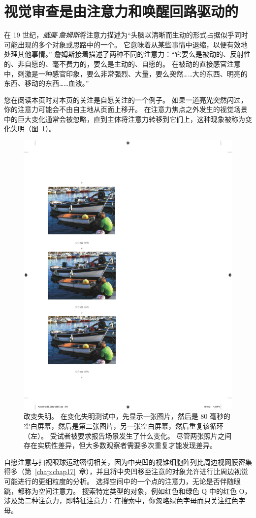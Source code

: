 \section{视觉审查是由注意力和唤醒回路驱动的}

在 19 世纪，\textit{威廉$\cdot$詹姆斯}将注意力描述为“头脑以清晰而生动的形式占据似乎同时可能出现的多个对象或思路中的一个。
它意味着从某些事情中退缩，以便有效地处理其他事情。” 
詹姆斯接着描述了两种不同的注意力：“它要么是被动的、反射性的、非自愿的、毫不费力的，要么是主动的、自愿的。
在被动的直接感官注意中，刺激是一种感官印象，要么非常强烈、大量，要么突然……大的东西、明亮的东西、移动的东西……血液。”


您在阅读本页时对本页的关注是自愿关注的一个例子。 如果一道亮光突然闪过，你的注意力可能会不由自主地从页面上移开。
在注意力焦点之外发生的视觉场景中的巨大变化通常会被忽略，直到主体将注意力转移到它们上，这种现象被称为变化失明（图~\ref{fig:25_8}）。


\begin{figure}[htbp]
	\centering
	\includegraphics[width=0.5\linewidth]{chap25/fig_25_8}
	\caption{改变失明。 在变化失明测试中，先显示一张图片，然后是 80 毫秒的空白屏幕，然后是第二张图片，另一张空白屏幕，然后重复该循环（左）。
		受试者被要求报告场景发生了什么变化。
		尽管两张照片之间存在实质性差异，但大多数观察者需要多次重复才能发现差异。}
	\label{fig:25_8}
\end{figure}


自愿注意与扫视眼球运动密切相关，因为中央凹的视锥细胞阵列比周边视网膜密集得多（第~\ref{chap:chap17}~章），并且将中央凹移至注意的对象允许进行比周边视觉可能进行的更细粒度的分析。 选择空间中的一个点的注意力，无论是否伴随眼跳，都称为空间注意力。
搜索特定类型的对象，例如红色和绿色 Q 中的红色 O，涉及第二种注意力，即特征注意力：在搜索中，你忽略绿色字母而只关注红色字母。


